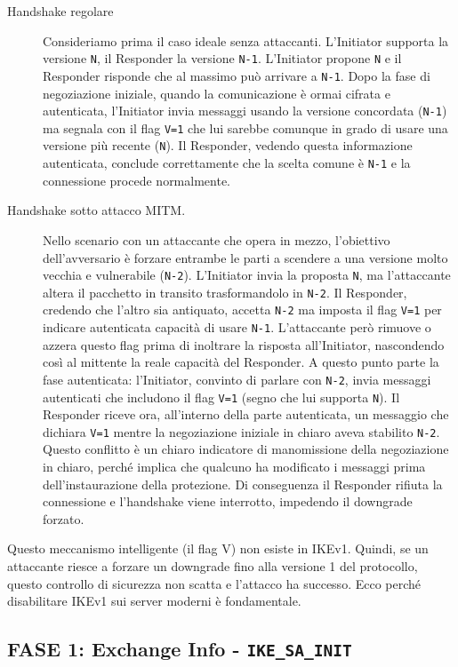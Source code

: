 \documentclass[a4paper, 11pt]{article}
\begin{document}
\begin{description}
    \item[Handshake regolare]
    Consideriamo prima il caso ideale senza attaccanti. L'Initiator supporta la versione \texttt{N}, il Responder la versione \texttt{N-1}. L'Initiator propone \texttt{N} e il Responder risponde che al massimo può arrivare a \texttt{N-1}. Dopo la fase di negoziazione iniziale, quando la comunicazione è ormai cifrata e autenticata, l'Initiator invia messaggi usando la versione concordata (\texttt{N-1}) ma segnala con il flag \texttt{V=1} che lui sarebbe comunque in grado di usare una versione più recente (\texttt{N}). Il Responder, vedendo questa informazione autenticata, conclude correttamente che la scelta comune è \texttt{N-1} e la connessione procede normalmente.
    \item[Handshake sotto attacco MITM.]
    Nello scenario con un attaccante che opera in mezzo, l'obiettivo dell'avversario è forzare entrambe le parti a scendere a una versione molto vecchia e vulnerabile (\texttt{N-2}). L'Initiator invia la proposta \texttt{N}, ma l'attaccante altera il pacchetto in transito trasformandolo in \texttt{N-2}. Il Responder, credendo che l'altro sia antiquato, accetta \texttt{N-2} ma imposta il flag \texttt{V=1} per indicare autenticata capacità di usare \texttt{N-1}. L'attaccante però rimuove o azzera questo flag prima di inoltrare la risposta all'Initiator, nascondendo così al mittente la reale capacità del Responder. A questo punto parte la fase autenticata: l'Initiator, convinto di parlare con \texttt{N-2}, invia messaggi autenticati che includono il flag \texttt{V=1} (segno che lui supporta \texttt{N}). Il Responder riceve ora, all'interno della parte autenticata, un messaggio che dichiara \texttt{V=1} mentre la negoziazione iniziale in chiaro aveva stabilito \texttt{N-2}. Questo conflitto è un chiaro indicatore di manomissione della negoziazione in chiaro, perché implica che qualcuno ha modificato i messaggi prima dell'instaurazione della protezione. Di conseguenza il Responder rifiuta la connessione e l'handshake viene interrotto, impedendo il downgrade forzato.
\end{description}

Questo meccanismo intelligente (il flag V) non esiste in IKEv1. Quindi, se un attaccante riesce a forzare un downgrade fino alla versione 1 del protocollo, questo controllo di sicurezza non scatta e l'attacco ha successo. Ecco perché disabilitare IKEv1 sui server moderni è fondamentale.

\subsection{FASE 1: Exchange Info - \texttt{IKE\_SA\_INIT}}
\end{document}

